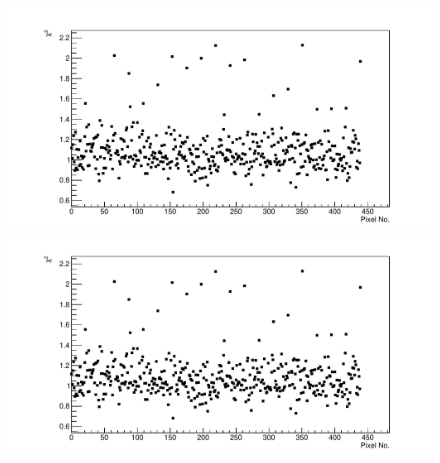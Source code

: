 \begin{figure}%
\includegraphics[width=\textwidth]{chapters/graphs/GainVarsMeas/LL_m04_2016-06-11/Set0and2/Chi2_AverageMethod_Noise_StandHV.pdf}
\caption{}
\vspace{3mm}
\includegraphics[width=\textwidth]{chapters/graphs/GainVarsMeas/LL_m04_2016-06-11/Set0and2/Chi2_AverageMethod_Noise_LowHV.pdf}
\caption{}
\end{figure}



